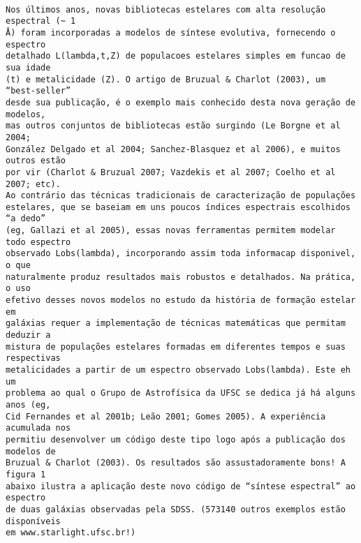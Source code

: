 \begin{verbatim}

Nos últimos anos, novas bibliotecas estelares com alta resolução espectral (~ 1
Å) foram incorporadas a modelos de síntese evolutiva, fornecendo o espectro
detalhado L(lambda,t,Z) de populacoes estelares simples em funcao de sua idade
(t) e metalicidade (Z). O artigo de Bruzual & Charlot (2003), um “best-seller”
desde sua publicação, é o exemplo mais conhecido desta nova geração de modelos,
mas outros conjuntos de bibliotecas estão surgindo (Le Borgne et al 2004;
González Delgado et al 2004; Sanchez-Blasquez et al 2006), e muitos outros estão
por vir (Charlot & Bruzual 2007; Vazdekis et al 2007; Coelho et al 2007; etc).
Ao contrário das técnicas tradicionais de caracterização de populações
estelares, que se baseiam em uns poucos índices espectrais escolhidos “a dedo”
(eg, Gallazi et al 2005), essas novas ferramentas permitem modelar todo espectro
observado Lobs(lambda), incorporando assim toda informacap disponivel, o que
naturalmente produz resultados mais robustos e detalhados. Na prática, o uso
efetivo desses novos modelos no estudo da história de formação estelar em
galáxias requer a implementação de técnicas matemáticas que permitam deduzir a
mistura de populações estelares formadas em diferentes tempos e suas respectivas
metalicidades a partir de um espectro observado Lobs(lambda). Este eh um
problema ao qual o Grupo de Astrofísica da UFSC se dedica já há alguns anos (eg,
Cid Fernandes et al 2001b; Leão 2001; Gomes 2005). A experiência acumulada nos
permitiu desenvolver um código deste tipo logo após a publicação dos modelos de
Bruzual & Charlot (2003). Os resultados são assustadoramente bons! A figura 1
abaixo ilustra a aplicação deste novo código de “síntese espectral” ao espectro
de duas galáxias observadas pela SDSS. (573140 outros exemplos estão disponíveis
em www.starlight.ufsc.br!)


\end{verbatim}
